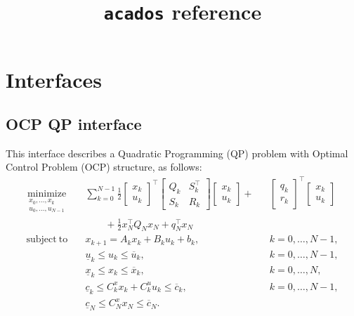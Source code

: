 \documentclass{report}
\title{\texttt{acados} reference}
\begin{document}
\maketitle

\chapter{Interfaces}

\section{OCP QP interface}
This interface describes a Quadratic Programming (QP) problem with Optimal Control Problem (OCP) structure, as follows:
\begin{subequations}
	\label{eq:OCP_QP}
	\begin{alignat}{3}
	\underset{\substack{x_0,\ldots,x_k \\ u_0,\ldots,u_{N-1}}}{\mathrm{minimize}} \quad & \sum_{k=0}^{N-1} \frac 1 2 \begin{bmatrix} x_k \\ u_k \end{bmatrix}^\top \begin{bmatrix} Q_k & S_k^\top \\ S_k & R_k \end{bmatrix} \begin{bmatrix} x_k \\ u_k \end{bmatrix} + &&\begin{bmatrix} q_k \\ r_k \end{bmatrix}^\top \begin{bmatrix} x_k \\ u_k \end{bmatrix} \\ & \qquad + \frac 1 2 x_N^\top Q_N x_N + q_N^\top x_N \nonumber \\
	\mathrm{subject~to} \quad & x_{k+1} = A_k x_k + B_k u_k + b_k, && k=0,\dots,N-1, \\
	& \underline u_k \leq u_k \leq \overline u_k, && k=0,\dots,N-1, \\
	& \underline x_k \leq x_k \leq \overline x_k, && k=0,\dots,N, \\
	& \underline c_k \leq C^x_k x_k + C^u_k u_k \leq \overline c_k, && k=0,\dots,N-1, \\
	& \underline c_N \leq C^x_N x_N \leq \overline c_N.
	\end{alignat}
\end{subequations}
\end{document}
